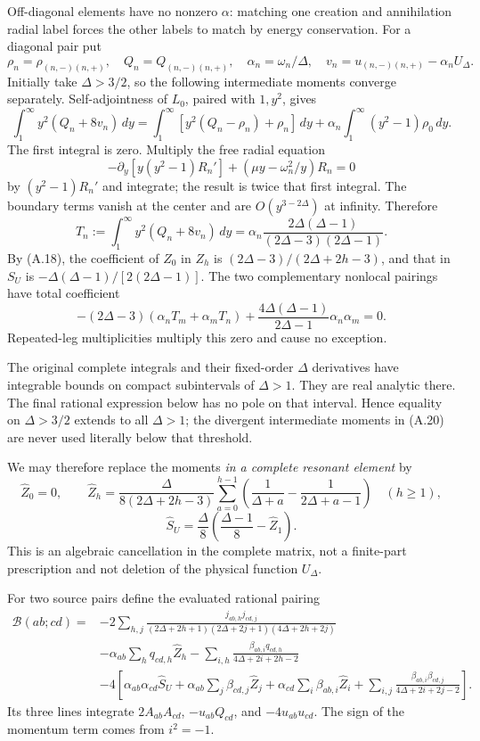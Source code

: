 \documentclass[a4paper,11pt]{article}
\numberwithin{equation}{section}
\begin{document}
Off-diagonal elements have no nonzero \(\alpha\): matching one creation and annihilation radial label forces the other labels to match by energy conservation. For a diagonal pair put \[
\rho_n=\rho_{(n,-)(n,+)},\quad Q_n=Q_{(n,-)(n,+)},\quad
\alpha_n=\omega_n/\Delta,\quad v_n=u_{(n,-)(n,+)}-\alpha_nU_\Delta .
\] Initially take \(\Delta>3/2\), so the following intermediate moments converge separately. Self-adjointness of \(L_0\), paired with \(1,y^2\), gives \[
\int_1^\infty y^2(Q_n+8v_n)\,dy
=\int_1^\infty[y^2(Q_n-\rho_n)+\rho_n]\,dy
+\alpha_n\int_1^\infty(y^2-1)\rho_0\,dy .
\tag{A.19}
\] The first integral is zero. Multiply the free radial equation \[
-\partial_y[y(y^2-1)R_n']
+(\mu y-\omega_n^2/y)R_n=0
\] by \((y^2-1)R_n'\) and integrate; the result is twice that first integral. The boundary terms vanish at the center and are \(O(y^{3-2\Delta})\) at infinity. Therefore \[
T_n:=\int_1^\infty y^2(Q_n+8v_n)\,dy
=\alpha_n\frac{2\Delta(\Delta-1)}
{(2\Delta-3)(2\Delta-1)} .
\tag{A.20}
\] By (A.18), the coefficient of \(Z_0\) in \(Z_h\) is \((2\Delta-3)/(2\Delta+2h-3)\), and that in \(S_U\) is \(-\Delta(\Delta-1)/[2(2\Delta-1)]\). The two complementary nonlocal pairings have total coefficient \[
-(2\Delta-3)(\alpha_nT_m+\alpha_mT_n)
+\frac{4\Delta(\Delta-1)}{2\Delta-1}\alpha_n\alpha_m=0.
\tag{A.21}
\] Repeated-leg multiplicities multiply this zero and cause no exception.

The original complete integrals and their fixed-order \(\Delta\) derivatives have integrable bounds on compact subintervals of \(\Delta>1\). They are real analytic there. The final rational expression below has no pole on that interval. Hence equality on \(\Delta>3/2\) extends to all \(\Delta>1\); the divergent intermediate moments in (A.20) are never used literally below that threshold.

We may therefore replace the moments \emph{in a complete resonant element} by \[
\widehat Z_0=0,\qquad
\widehat Z_h=\frac{\Delta}{8(2\Delta+2h-3)}
\sum_{a=0}^{h-1}\left(\frac1{\Delta+a}-\frac1{2\Delta+a-1}\right)
\quad(h\ge1),
\tag{A.22}
\] \[
\widehat S_U=\frac{\Delta}{8}
\left(\frac{\Delta-1}{8}-\widehat Z_1\right).
\] This is an algebraic cancellation in the complete matrix, not a finite-part prescription and not deletion of the physical function \(U_\Delta\).

For two source pairs define the evaluated rational pairing \[
\begin{aligned}
\mathcal B(ab;cd)={}&
-2\sum_{h,j}\frac{j_{ab,h}j_{cd,j}}
{(2\Delta+2h+1)(2\Delta+2j+1)(4\Delta+2h+2j)}\\
&-\alpha_{ab}\sum_hq_{cd,h}\widehat Z_h
-\sum_{i,h}\frac{\beta_{ab,i}q_{cd,h}}
{4\Delta+2i+2h-2}\\
&-4\left[
\alpha_{ab}\alpha_{cd}\widehat S_U
+\alpha_{ab}\sum_j\beta_{cd,j}\widehat Z_j
+\alpha_{cd}\sum_i\beta_{ab,i}\widehat Z_i
+\sum_{i,j}\frac{\beta_{ab,i}\beta_{cd,j}}
{4\Delta+2i+2j-2}
\right].
\end{aligned}
\tag{A.23}
\] Its three lines integrate \(2A_{ab}A_{cd}\), \(-u_{ab}Q_{cd}\), and \(-4u_{ab}u_{cd}\). The sign of the momentum term comes from \(i^2=-1\).
\end{document}
